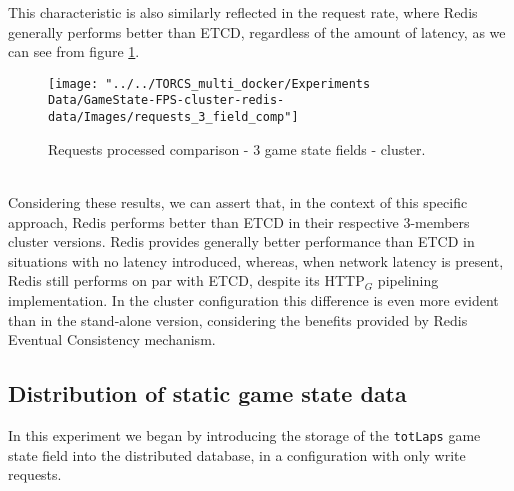 This characteristic is also similarly reflected in the request rate, where Redis generally performs better than ETCD, regardless of the amount of latency, as we can see from figure \ref{fig:requests-3-field-comparison-cluster}. \\
\begin{figure}[h!]
	\centering
	\texttt{[image: "../../TORCS\_multi\_docker/Experiments Data/GameState-FPS-cluster-redis-data/Images/requests\_3\_field\_comp"]}
	\caption[Requests processed comparison - 3 game state fields - cluster]{Requests processed comparison - 3 game state fields - cluster.}
	\label{fig:requests-3-field-comparison-cluster}
\end{figure}
\\ Considering these results, we can assert that, in the context of this specific approach, Redis performs better than ETCD in their respective 3-members cluster versions. Redis provides generally better performance than ETCD in situations with no latency introduced, whereas, when network latency is present, Redis still performs on par with ETCD, despite its HTTP$_G$ pipelining implementation. In the cluster configuration this difference is even more evident than in the stand-alone version, considering the benefits provided by Redis Eventual Consistency mechanism.

\subsection{Distribution of static game state data}
In this experiment we began by introducing the storage of the \texttt{totLaps} game state field into the distributed database, in a configuration with only write requests.

